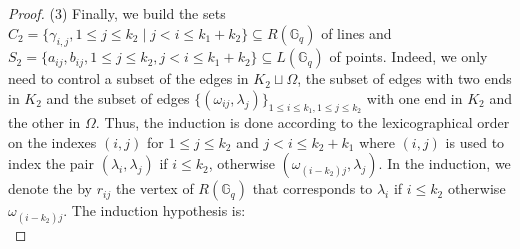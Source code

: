 \documentclass[10pt,a4paper]{article}
\newcommand{\ls}{\leqslant}
\newcommand{\G}[1][q]{\mathbb{G}_{#1}}
\begin{document}
\begin{proof}
        (3) Finally, we build the sets $C_2=\{\gamma_{i,j}, 1 \ls j \ls k_2 \mid j < i \ls k_1 + k_2\} \subseteq R(\G)$ of lines and $S_2 = \{a_{ij}, b_{ij}, 1 \ls j \ls k_2, j < i \ls k_1 + k_2 \} \subseteq L(\G)$ of points. Indeed, we only need to control a subset of the edges in $K_2 \sqcup \Omega$, the subset of edges with two ends in $K_2$ and the subset of edges $\{(\omega_{ij}, \lambda_j)\}_{1 \ls i \ls k_1, 1 \ls j \ls k_2}$ with one end in $K_2$ and the other in $\Omega$.
        Thus, the induction is done according to the lexicographical order on the indexes $(i,j)$ for $1 \ls j \ls k_2$ and $j < i \ls k_2 + k_1$ where $(i,j)$ is used to index the pair $(\lambda_i, \lambda_j)$ if $i \ls k_2$, otherwise $(\omega_{(i-k_2)j}, \lambda_j)$. In the induction, we denote the by $r_{ij}$ the vertex of $R(\G)$ that corresponds to $\lambda_i$ if $i \ls k_2$ otherwise $\omega_{(i-k_2)j}$. 
        The induction hypothesis is: \\


\end{proof}
\end{document}
